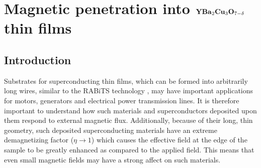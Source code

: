 %
%


\chapter{Magnetic penetration into $\mathbf{YBa}_2\mathbf{Cu}_3\mathbf{O}_{7-\delta}$ thin films}
\label{chap:magpen}




%
%

%
%




\section{Introduction}
\label{sec:magpen_intro}

%
%
Substrates for 
superconducting thin films, which can be formed into 
arbitrarily long wires, 
similar to the RABiTS 
technology \cite{feldman_apl_77_2000,feldman_2000,rabits_web},
may have important applications for motors, generators and electrical power
transmission lines. It is therefore important to understand how
such materials and superconductors deposited upon them 
respond to external magnetic flux. Additionally, because
of their long, thin geometry, such deposited superconducting  
materials have an extreme demagnetizing
factor ($\eta \rightarrow 1$) which causes the effective field at 
the edge of the sample to be greatly enhanced as compared to 
the applied field. This means that even small magnetic fields may
have a strong affect on such materials.

